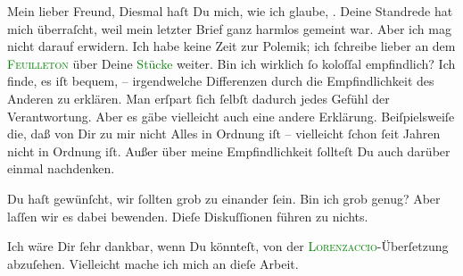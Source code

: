 \pstart{}Mein lieber Freund,\pend
\pstart
           Diesmal haſt Du mich, wie ich glaube, \label{K_L03193-1v}\label{K_L03193-1h}. Deine Standrede hat mich  überraſcht,
               weil mein letzter Brief ganz harmlos gemeint war. Aber ich mag nicht darauf erwidern.
               Ich habe keine Zeit zur Polemik; ich ſchreibe lieber an dem \textsc{\textcolor{green}{Feuilleton}{}\ledrightnote{{$\rightarrow$}\textcolor{green}{Berliner Theater. (»Lebendige Stunden« von Arthur Schnitzler.)}}} über Deine \textcolor{green}{Stücke}{}\ledrightnote{{$\rightarrow$}\textcolor{green}{Lebendige Stunden. Vier Einakter}}
               weiter. Bin ich wirklich ſo koloſſal empfindlich? Ich finde, es iſt bequem, –  irgendwelche
               Differenzen durch die Empfindlichkeit des Anderen zu erklären. Man erſpart ſich
               ſelbſt dadurch jedes Gefühl der Verantwortung. Aber es gäbe vielleicht auch eine
               andere Erklärung. Beiſpielsweiſe die, daß von Dir zu mir nicht Alles in Ordnung iſt –
               vielleicht ſchon ſeit Jahren nicht in Ordnung iſt. Außer über meine Empfindlichkeit
               ſollteſt Du auch darüber einmal nachdenken.\pend
           
\pstart
           Du haſt gewünſcht, wir ſollten grob zu einander ſein. Bin ich grob genug? Aber laſſen
               wir es dabei {\pb}bewenden. Dieſe Diskuſſionen führen zu
               nichts.\pend
           
\pstart
           Ich wäre Dir ſehr dankbar, wenn Du \label{K_L03193-2v}\label{K_L03193-2h} könnteſt, von der \textsc{\textcolor{green}{Lorenzaccio}{}\ledrightnote{{$\rightarrow$}\textcolor{green}{Lorenzaccio. Drame romantique en cinq actes}}}-Überſetzung abzuſehen. Vielleicht mache ich mich \label{K_L03193-4v}\label{K_L03193-4h} an dieſe Arbeit.\pend
           
